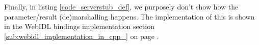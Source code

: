 Finally, in listing \ref{code_serverstub_def}, we purposely don't show how the parameter/result (de)marshalling happens. The implementation of this is shown in the WebIDL bindings implementation section \ref{sub:webidl_implementation_in_cpp_} on page \pageref{sub:webidl_implementation_in_cpp_}.


